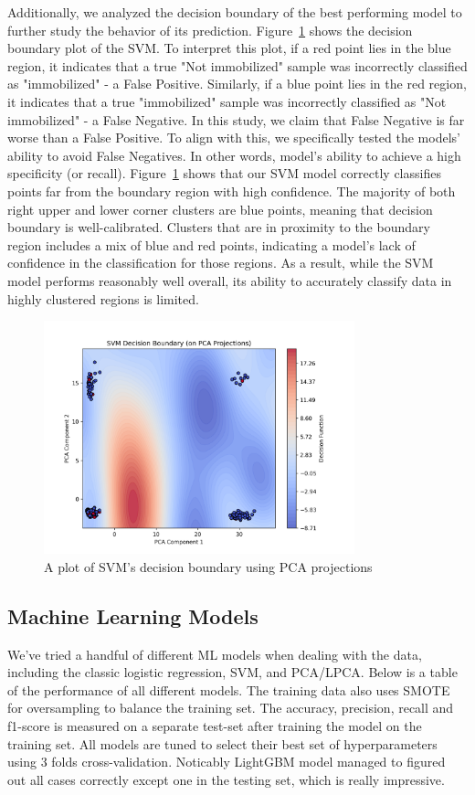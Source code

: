 \documentclass[10pt,letterpaper]{article}
\begin{document}
Additionally, we analyzed the decision boundary of the best performing model to further study the behavior of its prediction. Figure~\ref{fig:svm_decision} shows the decision boundary plot of the SVM. To interpret this plot, if a red point lies in the blue region, it indicates that a true "Not immobilized" sample was incorrectly classified as "immobilized" - a False Positive. Similarly, if a blue point lies in the red region, it indicates that a true "immobilized" sample was incorrectly classified as "Not immobilized" - a False Negative. In this study, we claim that False Negative is far worse than a False Positive. To align with this, we specifically tested the models' ability to avoid False Negatives. In other words, model's ability to achieve a high specificity (or recall). Figure~\ref{fig:svm_decision} shows that our SVM model correctly classifies points far from the boundary region with high confidence. The majority of both right upper and lower corner clusters are blue points, meaning that decision boundary is well-calibrated. Clusters that are in proximity to the boundary region includes a mix of blue and red points, indicating a model's lack of confidence in the classification for those regions. As a result, while the SVM model performs reasonably well overall, its ability to accurately classify data in highly clustered regions is limited.

\begin{figure}[tb!]
%
\centering
\includegraphics[width=9cm]{plots/svm_decision.png}
\caption{A plot of SVM's decision boundary using PCA projections}%
\label{fig:svm_decision}
\end{figure}


\subsection{Machine Learning Models}
We've tried a handful of different ML models when dealing with the data, including the classic logistic regression, SVM, and PCA/LPCA. Below is a table of the performance of all different models. The training data also uses SMOTE for oversampling to balance the training set. The accuracy, precision, recall and f1-score is measured on a separate test-set after training the model on the training set. All models are tuned to select their best set of hyperparameters using 3 folds cross-validation. Noticably LightGBM model managed to figured out all cases correctly except one in the testing set, which is really impressive.
\end{document}
